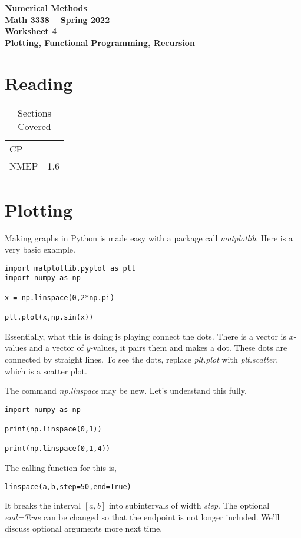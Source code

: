 \documentclass[11pt,letterpaper]{article}
\newcommand{\semester}{Spring 2022}
\begin{document}
\begin{center}
{\huge{\bf  Numerical Methods}} \\[1.5ex]
{\bf Math 3338 -- \semester}\\[1.5ex]
{\Large{\bf Worksheet 4\ \\[2ex] Plotting, Functional Programming, Recursion}}\\
\end{center}
\vspace{2mm}

\section{Reading}

\begin{table}[!ht]
 \centering
 \begin{tabular}{ll}
   CP &  \\
 NMEP & 1.6 
 \end{tabular}
\caption{Sections Covered}
\end{table}




\section{Plotting}

Making graphs in Python is made easy with a package call \emph{matplotlib}. Here is a very basic 
example.
\begin{verbatim}
import matplotlib.pyplot as plt
import numpy as np

x = np.linspace(0,2*np.pi)

plt.plot(x,np.sin(x))
\end{verbatim}
Essentially, what this is doing is playing connect the dots. There is a vector is $x$-values and
a vector of $y$-values, it pairs them and makes a dot. These dots are connected by straight lines.
To see the dots, replace \emph{plt.plot} with \emph{plt.scatter}, which is a scatter plot.

The command \emph{np.linspace} may be new. Let's understand this fully.
\begin{verbatim}
import numpy as np

print(np.linspace(0,1))

print(np.linspace(0,1,4))
\end{verbatim}
The calling function for this is,
\begin{verbatim}
linspace(a,b,step=50,end=True)
\end{verbatim}
It breaks the interval $[a,b]$ into subintervals of width \emph{step}. The optional \emph{end=True}
can be changed so that the endpoint is not longer included. We'll discuss optional arguments more
next time.
\end{document}
